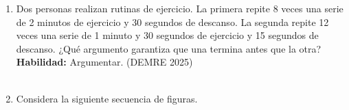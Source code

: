 \documentclass[11pt,letterpaper]{article}
\newenvironment{alternativas}{%
\begin{enumerate}[label=\Alph*), leftmargin=14pt, itemsep=2pt, topsep=2pt]
}{\end{enumerate}}
\begin{document}
\begin{enumerate}[label=\textbf{\arabic*.}, leftmargin=*, itemsep=8pt, start=6]
\item
\begin{minipage}[t]{\linewidth}
Dos personas realizan rutinas de ejercicio. La primera repite 8 veces una serie de 2 minutos de ejercicio y 30 segundos de descanso. La segunda repite 12 veces una serie de 1 minuto y 30 segundos de ejercicio y 15 segundos de descanso. ¿Qué argumento garantiza que una termina antes que la otra?\\
\textbf{Habilidad:} Argumentar. (DEMRE 2025)\\
\\%
\begin{minipage}{\linewidth}
\vspace{7mm}
\end{minipage}
\vspace{7mm}
\end{minipage}

\item
\begin{minipage}[t]{\linewidth}
Considera la siguiente secuencia de figuras.\\


\end{minipage}
\end{enumerate}
\end{document}
